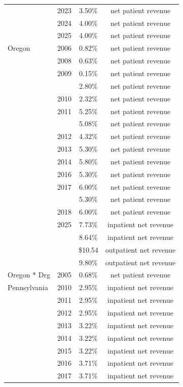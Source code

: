 \begin{longtable}{llcc}
 & 2023 & 3.50\% & net patient revenue \\[0pt]
 & 2024 & 4.00\% & net patient revenue \\[0pt]
 & 2025 & 4.00\% & net patient revenue \\[0pt]
\midrule
Oregon & 2006 & 0.82\% & net patient revenue \\[0pt]
 & 2008 & 0.63\% & net patient revenue \\[0pt]
 & 2009 & 0.15\% & net patient revenue \\[0pt]
 &  & 2.80\% & net patient revenue \\[0pt]
 & 2010 & 2.32\% & net patient revenue \\[0pt]
 & 2011 & 5.25\% & net patient revenue \\[0pt]
 &  & 5.08\% & net patient revenue \\[0pt]
 & 2012 & 4.32\% & net patient revenue \\[0pt]
 & 2013 & 5.30\% & net patient revenue \\[0pt]
 & 2014 & 5.80\% & net patient revenue \\[0pt]
 & 2016 & 5.30\% & net patient revenue \\[0pt]
 & 2017 & 6.00\% & net patient revenue \\[0pt]
 &  & 5.30\% & net patient revenue \\[0pt]
 & 2018 & 6.00\% & net patient revenue \\[0pt]
 & 2025 & 7.73\% & inpatient net revenue \\[0pt]
 &  & 8.64\% & inpatient net revenue \\[0pt]
 &  & \$10.54 & outpatient net revenue \\[0pt]
 &  & 9.80\% & outpatient net revenue \\[0pt]
\midrule
Oregon * Drg & 2005 & 0.68\% & net patient revenue \\[0pt]
\midrule
Pennsylvania & 2010 & 2.95\% & inpatient net revenue \\[0pt]
 & 2011 & 2.95\% & inpatient net revenue \\[0pt]
 & 2012 & 2.95\% & inpatient net revenue \\[0pt]
 & 2013 & 3.22\% & inpatient net revenue \\[0pt]
 & 2014 & 3.22\% & inpatient net revenue \\[0pt]
 & 2015 & 3.22\% & inpatient net revenue \\[0pt]
 & 2016 & 3.71\% & inpatient net revenue \\[0pt]
 & 2017 & 3.71\% & inpatient net revenue \\[0pt]

\end{longtable}

